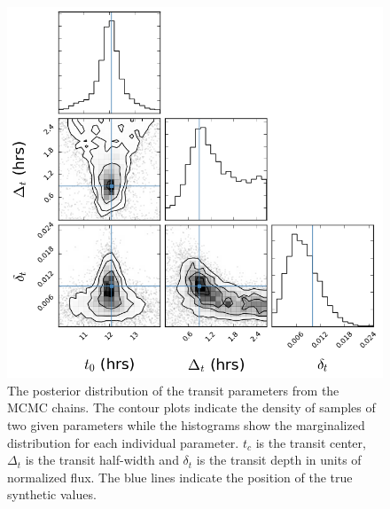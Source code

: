 \documentclass[twocolumn]{aastex61}
\begin{document}
\begin{figure}[b]
  \includegraphics[width=0.8\linewidth]{figs/results/transit/transit_corner.png}
  \caption{\small The posterior distribution of the transit parameters from the MCMC chains. The contour plots indicate the density of samples of two given parameters while the histograms show the marginalized distribution for each individual parameter. $t_{c}$ is the transit center, $\Delta_{t}$ is the transit half-width and $\delta_{t}$ is the transit depth in units of normalized flux. The blue lines indicate the position of the true synthetic values.}
  \label{fig:transCorner}
\end{figure}
\end{document}
